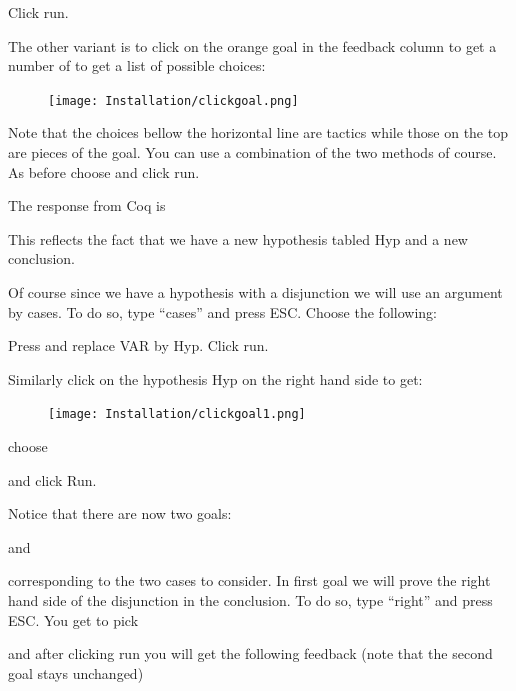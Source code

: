 Click run.


The other variant is to click on the orange goal in the feedback column to get a number of  to get a list of possible choices:
\begin{figure}[h!]
\texttt{[image: Installation/clickgoal.png]}
\label{tactics}
\end{figure}
Note that the choices bellow the horizontal line are tactics while those on the top are pieces of the goal. You can use a combination of the two methods of course. As before choose 
 and click run.


The response from Coq is


This reflects the fact that we have a new hypothesis tabled Hyp  and a new conclusion.

Of course since we have a hypothesis with a disjunction we will use an argument by cases. To do so, type ``cases'' and press ESC. Choose the following:

Press \VAR and replace VAR by Hyp. Click run.

Similarly click on the hypothesis Hyp on the right hand side to get:

\begin{figure}[h!]
\texttt{[image: Installation/clickgoal1.png]}
\label{tactics}
\end{figure}
 choose 

and click Run.

Notice that there are now two goals:

and 


corresponding to the two cases to consider. In first goal we will prove the right hand side of the disjunction in the conclusion. To do so, type ``right'' and press ESC. You get to pick


and after clicking run you will get the following feedback (note that the second goal stays unchanged)

